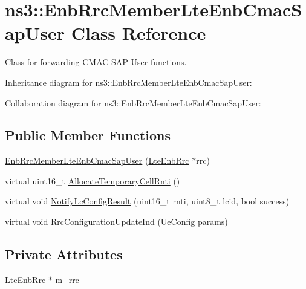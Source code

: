 \hypertarget{classns3_1_1EnbRrcMemberLteEnbCmacSapUser}{}\section{ns3\+:\+:Enb\+Rrc\+Member\+Lte\+Enb\+Cmac\+Sap\+User Class Reference}
\label{classns3_1_1EnbRrcMemberLteEnbCmacSapUser}


Class for forwarding C\+M\+AC S\+AP User functions.  




Inheritance diagram for ns3\+:\+:Enb\+Rrc\+Member\+Lte\+Enb\+Cmac\+Sap\+User\+:


Collaboration diagram for ns3\+:\+:Enb\+Rrc\+Member\+Lte\+Enb\+Cmac\+Sap\+User\+:
\subsection*{Public Member Functions}
\begin{DoxyCompactItemize}
\item 
\hyperlink{classns3_1_1EnbRrcMemberLteEnbCmacSapUser_a5808f745ee3c446ec0636d8ca9982e66}{Enb\+Rrc\+Member\+Lte\+Enb\+Cmac\+Sap\+User} (\hyperlink{classns3_1_1LteEnbRrc}{Lte\+Enb\+Rrc} $\ast$rrc)
\item 
virtual uint16\+\_\+t \hyperlink{classns3_1_1EnbRrcMemberLteEnbCmacSapUser_a1351a4b6fc3e5efc4b5a6b3c4d2e7dd3}{Allocate\+Temporary\+Cell\+Rnti} ()
\item 
virtual void \hyperlink{classns3_1_1EnbRrcMemberLteEnbCmacSapUser_a06eaf49a4c6255044ce85c13c3b43a32}{Notify\+Lc\+Config\+Result} (uint16\+\_\+t rnti, uint8\+\_\+t lcid, bool success)
\item 
virtual void \hyperlink{classns3_1_1EnbRrcMemberLteEnbCmacSapUser_a5d77743a714cad5b477f95340c7cd2a6}{Rrc\+Configuration\+Update\+Ind} (\hyperlink{structns3_1_1LteEnbCmacSapUser_1_1UeConfig}{Ue\+Config} params)
\end{DoxyCompactItemize}
\subsection*{Private Attributes}
\begin{DoxyCompactItemize}
\item 
\hyperlink{classns3_1_1LteEnbRrc}{Lte\+Enb\+Rrc} $\ast$ \hyperlink{classns3_1_1EnbRrcMemberLteEnbCmacSapUser_a77f853b016838574d7011999ac29a357}{m\+\_\+rrc}
\end{DoxyCompactItemize}


